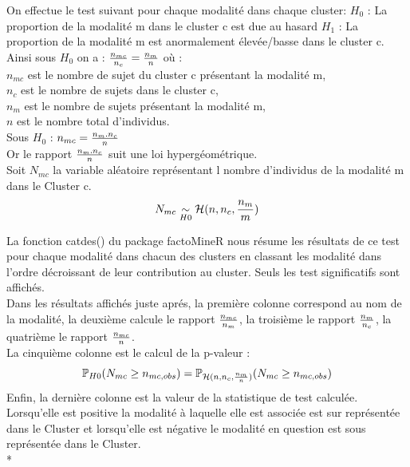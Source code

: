 \documentclass{book}
\begin{document}
On effectue le test suivant pour chaque modalité dans chaque cluster:
\noindent 
$H_0$ : La proportion de la modalité m dans le cluster c est due au hasard
\noindent
$H_1$ : La proportion de la modalité m est anormalement élevée/basse dans le cluster c.\\

\noindent
Ainsi sous $H_0$ on a : 
${{n_{mc}} \over {n_c}} = {{n_m} \over {n}} $ où :\\
$n_{mc}$ est le nombre de sujet du cluster c présentant la modalité m,\\
$n_c$ est le nombre de sujets dans le cluster c,\\
$n_m$ est le nombre de sujets présentant la modalité m,\\
$n$ est le nombre total d'individus.\\
	
\noindent
Sous $H_0$ : $n_{mc}  = {n_m . n_c \over {n}} $\\
Or le rapport ${n_m . n_c \over {n}} $ suit une loi hypergéométrique.\\
Soit $N_{mc}$ la variable aléatoire représentant l nombre d'individus de la modalité m dans le Cluster c.
\begin{equation}
 N_{mc} \underset{H0}{\sim} \mathcal{H}(n, n_c, {{n_m}\over {m}})
\end{equation}

\noindent
La fonction catdes() du package factoMineR nous résume les résultats de ce test pour chaque modalité dans chacun des clusters en classant les modalité dans l'ordre décroissant de leur contribution au cluster.
Seuls les test significatifs sont affichés.\\

\noindent
Dans les résultats affichés juste aprés, la première colonne correspond au nom de la modalité, la deuxième calcule le rapport $n_{mc} \over n_m$, la troisième le rapport $n_m \over n_c$, la quatrième le rapport $n_{mc} \over n$.\\
La cinquième colonne est le calcul de la p-valeur :\\
\begin{equation}
\mathbb{P}_{H0}(N_{mc} \geq n_{mc, obs}) =  \mathbb{P}_{\mathcal{H}(n, n_c, {n_m \over n})}(N_{mc} \geq n_{mc, obs})
\end{equation} 
Enfin, la dernière colonne est la valeur de la statistique de test calculée. Lorsqu'elle est positive la modalité à laquelle elle est associée est sur représentée dans le Cluster et lorsqu'elle est négative le modalité en question est sous représentée dans le Cluster.\\*
\end{document}
